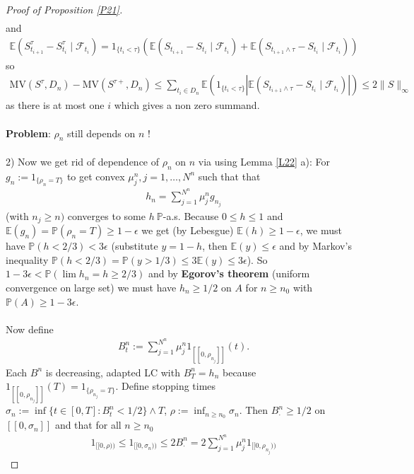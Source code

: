 \documentclass[12pt,a4paper, twoside]{article}
\theoremstyle{definition}
\newcommand{\EE}{\mathbb{E}} %
\newcommand{\PP}{\mathbb{P}} %
\newcommand{\MV}{\text{MV}}
\begin{document}
\begin{proof}[Proof of Proposition \ref{P21}]
\begin{align*}
\end{align*}
and 
\begin{align*}
\EE(S_{t_{i+1}}^\tau - S_{t_i}^\tau \mid \mathcal{F}_{t_i}) = 1_{\{t_i < \tau\}} ( \EE(S_{t_{i+1}}- S_{t_i} \mid \mathcal{F}_{t_i}) + \EE( S_{t_{i+1} \wedge \tau}- S_{t_i} \mid \mathcal{F}_{t_i}))
\end{align*}
so
\begin{align*}
\MV(S^\tau , D_n)- \MV(S^{\tau+}, D_n) \leq \sum_{t_i \in D_n} \EE(1_{\{t_i < \tau\}} | \EE( S_{t_{i+1} \wedge \tau} - S_{t_i} \mid \mathcal{F}_{t_i})|) \leq 2 \|S\|_\infty
\end{align*}
as there is at most one $i$ which gives a non zero summand. 
\\\\
\textbf{Problem}: $\rho_n$ still depends on $n$ !
\\\\
2) Now we get rid of dependence of $\rho_n$ on $n$ via using Lemma \ref{L22} a): For $g_n := 1_{\{ \rho_n = T \}}$ to get convex $\mu_j^n, j= 1 , \dots , N^n$ such that that 
\begin{align*}
h_n = \sum_{j=1}^{N^n} \mu_j^n g_{n_j}
\end{align*} 
(with $n_j \geq n)$ converges to some $h \ \PP$-a.s.
\newpage
Because $0 \leq h \leq 1$ and $\EE(g_n)= \PP( \rho_n=T) \geq 1- \epsilon$ we get (by Lebesgue) $\EE(h) \geq 1- \epsilon$, we must have $\PP(h < 2/3) < 3 \epsilon$ (substitute $y=1-h$, then $\EE(y) \leq \epsilon$ and by Markov's inequality $\PP(h<2/3)=\PP(y>1/3) \leq 3 \EE(y) \leq 3 \epsilon$). So $1-3 \epsilon < \PP ( \lim h_n = h \geq 2/3)$ and by \textbf{Egorov's theorem} (uniform convergence on large set) we must have $h_n \geq 1/2$ on $A$ for $n \geq n_0$ with $\PP(A) \geq 1- 3 \epsilon$. \\
\\
Now define
\begin{align*}
B_t^n := \sum_{j=1}^{N^n} \mu_j^n 1_{[\![ 0 , \rho_{n_j} ]\!]} (t).
\end{align*}
Each $B^n$ is decreasing, adapted LC with $B_T^n = h_n$ because $1_{[\![0 , \rho_{n_j} ]\!]}(T)= 1_{\{ \rho_{n_j}=T\}}$. Define stopping times $\sigma_n := \inf \{ t \in [0,T] : B_t^n < 1/2\} \wedge T$, $\rho := \inf_{n \geq n_0} \sigma_n$. Then $B_\cdot^n \geq 1/2$ on $[\![0 , \sigma_n ]\!]$ and that for all $n \geq n_0$ 
\begin{align*}
1_{[\![ 0 , \rho)\!)} \leq 1_{ [\![ 0 , \sigma_n )\!)} \leq 2B_\cdot^n = 2 \sum_{j=1}^{N^n} \mu_j^n 1_{[\![ 0 , \rho_{n_j})\!)} \tag{**}

\end{align*}
\end{proof}
\end{document}
